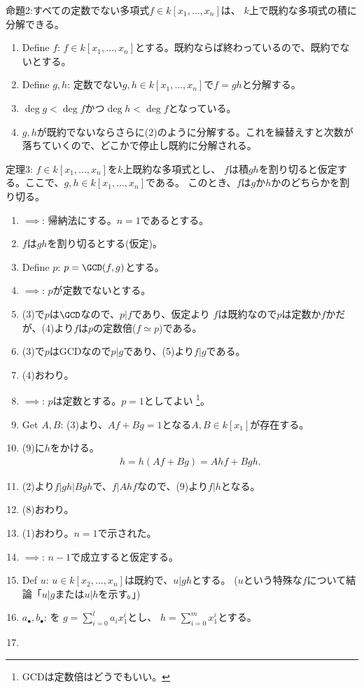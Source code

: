 命題2:すべての定数でない多項式$f\in k[x_1,\dots,x_n]$は、
$k$上で既約な多項式の積に分解できる。
\begin{myproof}
  \begin{enumerate}[label=(\arabic*)]
    \item Define $f$: $f\in k[x_1,\dots,x_n]$とする。既約ならば終わっているので、既約でないとする。
    \item Define $g,h$: 定数でない$g,h\in k [x_1,\dots,x_n]$で$f=gh$と分解する。
    \item $\deg g < \deg f$かつ$\deg h < \deg f$となっている。
    \item $g,h$が既約でないならさらに(2)のように分解する。これを繰替えすと次数が落ちていくので、どこかで停止し既約に分解される。
  \end{enumerate}
\end{myproof}

定理3:
$f\in k[x_1,\dots,x_n]$を$k$上既約な多項式とし、
$f$は積$gh$を割り切ると仮定する。ここで、$g,h\in k[x_1,\dots,x_n]$である。
このとき、$f$は$g$か$h$かのどちらかを割り切る。
\begin{myproof}
  \begin{enumerate}[label=(\arabic*)]
    \item $\implies$: 帰納法にする。$n=1$であるとする。
    \item $f$は$gh$を割り切るとする(仮定)。
    \item Define $p$: $p=\GCD(f,g)$とする。
    \item $\implies$: $p$が定数でないとする。
    \item (3)で$p$は$\GCD$なので、$p|f$であり、仮定より
    $f$は既約なので$p$は定数か$f$かだが、(4)より$f$は$p$の定数倍($f\simeq p$)である。
    \item (3)で$p$はGCDなので$p|g$であり、(5)より$f|g$である。
    \item (4)おわり。
    \item $\implies$: $p$は定数とする。$p=1$としてよい
    \footnote{GCDは定数倍はどうでもいい。}。
    \item Get $A,B$: (3)より、$Af+Bg = 1$となる$A,B\in k[x_1]$が存在する。
    \item (9)に$h$をかける。
    \begin{align}
      h = h(Af+Bg) = Ahf + Bgh.
    \end{align}
    \item (2)より$f|gh|Bgh$で、$f|Ahf$なので、(9)より$f|h$となる。
    \item (8)おわり。
    \item (1)おわり。$n=1$で示された。
    \item $\implies$: $n-1$で成立すると仮定する。
    \item Def $u$: $u\in k[x_2,\dots,x_n]$は既約で、$u|gh$とする。
    ($u$という特殊な$f$について結論「$u|g$または$u|h$を示す。」)
    \item $a_\bullet,b_\bullet$: を $g=\sum_{i=0}^l a_i x_1^i$とし、
    $h=\sum_{i=0}^m x_1^i$とする。
    \item
  \end{enumerate}
\end{myproof}

